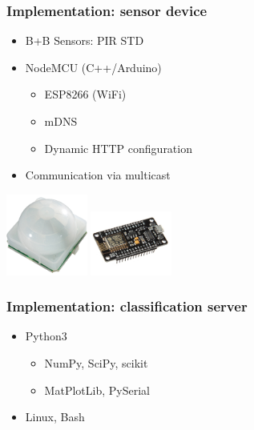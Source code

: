 \documentclass[10pt,xcolor=pdflatex]{beamer}
\begin{document}
\begin{frame}\frametitle{Implementation: sensor device}
    \begin{itemize}
        \item B+B Sensors: PIR STD
        \item NodeMCU (C++/Arduino)
            \begin{itemize}
                \item ESP8266 (WiFi)
                \item mDNS
                \item Dynamic HTTP configuration
            \end{itemize}
        \item Communication via multicast
    \end{itemize}  
    \begin{multicols}{2}
        \begin{center}
            \includegraphics[width=0.2\textwidth]{img/pirstd.png}
            \includegraphics[width=0.2\textwidth]{img/nodemcu.png}
        \end{center}
    \end{multicols}
\end{frame} 

\begin{frame}\frametitle{Implementation: classification server}
    \begin{itemize}
        \item Python3
            \begin{itemize}
                \item NumPy, SciPy, scikit
                \item MatPlotLib, PySerial
            \end{itemize}
        \item Linux, Bash
    \end{itemize}
\end{frame}


\end{document}
